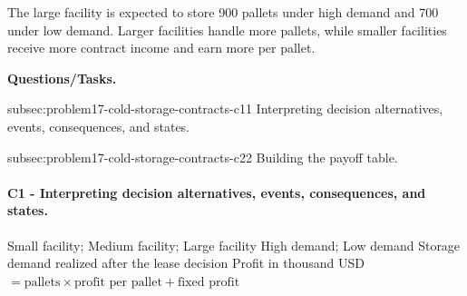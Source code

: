 	The large facility is expected to store 900 pallets under high demand and 700 under low demand. Larger facilities handle more pallets, while smaller facilities receive more contract income and earn more per pallet.

	\textbf{Questions/Tasks.}
	\begin{enumerate}
		\CriterionTask
		{subsec:problem17-cold-storage-contracts-c1}{1}
		{Interpreting decision alternatives, events, consequences, and states.}

		\CriterionTask
		{subsec:problem17-cold-storage-contracts-c2}{2}
		{Building the payoff table.}
	\end{enumerate}

\paragraph*{C1 - Interpreting decision alternatives, events, consequences, and states.}
	\label{subsec:problem17-cold-storage-contracts-c1}
	\DecisionElementsTable
	{Small facility; Medium facility; Large facility}
	{High demand; Low demand}
	{Storage demand realized after the lease decision}
	{Profit in thousand USD $= \text{pallets} \times \text{profit per pallet} + \text{fixed profit}$}


